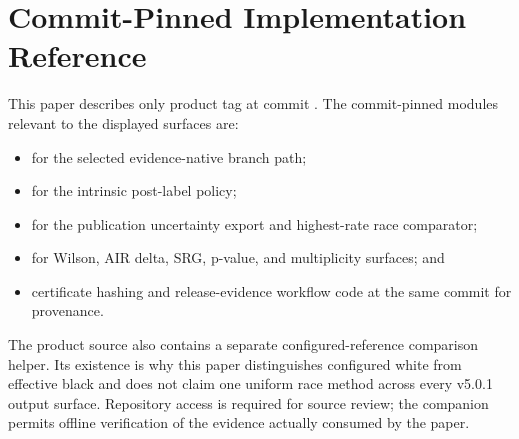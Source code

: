 \section{Commit-Pinned Implementation Reference}

This paper describes only product tag \ProductReleaseTag{} at commit
\IdentityText{\ProductCommitRaw}. The commit-pinned modules relevant to the displayed surfaces are:

\begin{itemize}
  \item {} for the selected evidence-native branch path;
  \item {} for the intrinsic post-label policy;
  \item {} for the publication uncertainty export and
        highest-rate race comparator;
  \item {} for Wilson, AIR delta, SRG, p-value, and
        multiplicity surfaces; and
  \item certificate hashing and release-evidence workflow code at the same commit for provenance.
\end{itemize}

The product source also contains a separate configured-reference comparison helper. Its existence
is why this paper distinguishes configured white from effective black and does not claim one
uniform race method across every v5.0.1 output surface. Repository access is required for source
review; the companion permits offline verification of the evidence actually consumed by the paper.
